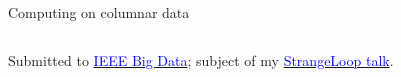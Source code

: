 \documentclass{beamer}
\begin{document}
\begin{frame}[fragile]{Computing on columnar data}
\begin{columns}[b]
\end{columns}

\vspace{0.35 cm}
Submitted to \href{http://cci.drexel.edu/bigdata/bigdata2017/index.html}{\textcolor{blue}{IEEE Big Data}}; subject of my \href{https://thestrangeloop.com/2017/particle-physics-10-000-times-faster.html}{\textcolor{blue}{StrangeLoop talk}}.
\end{frame}
\end{document}
